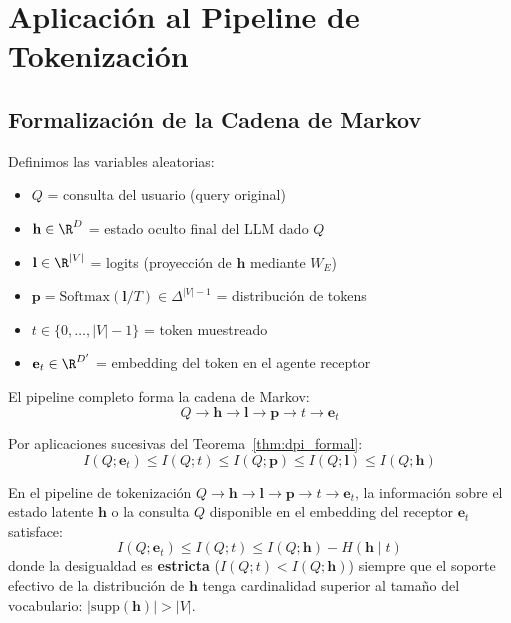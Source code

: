 \section{Aplicación al Pipeline de Tokenización}

\subsection{Formalización de la Cadena de Markov}

Definimos las variables aleatorias:
\begin{itemize}
\item $Q$ = consulta del usuario (query original)
\item $\mathbf{h} \in \R^D$ = estado oculto final del LLM dado $Q$
\item $\mathbf{l} \in \R^{|V|}$ = logits (proyección de $\mathbf{h}$ mediante $W_E$)
\item $\mathbf{p} = \text{Softmax}(\mathbf{l}/T) \in \Delta^{|V|-1}$ = distribución de tokens
\item $t \in \{0,\ldots,|V|-1\}$ = token muestreado
\item $\mathbf{e}_t \in \R^{D'}$ = embedding del token en el agente receptor
\end{itemize}

El pipeline completo forma la cadena de Markov:
\begin{equation}
Q \to \mathbf{h} \to \mathbf{l} \to \mathbf{p} \to t \to \mathbf{e}_t
\end{equation}

Por aplicaciones sucesivas del Teorema~\ref{thm:dpi_formal}:
\begin{equation}
I(Q; \mathbf{e}_t) \le I(Q; t) \le I(Q; \mathbf{p}) \le I(Q; \mathbf{l}) \le I(Q; \mathbf{h})
\label{eq:dpi_chain}
\end{equation}

\begin{corollary}
\label{cor:dpi_acumulada}
En el pipeline de tokenización $Q \to \mathbf{h} \to \mathbf{l} \to \mathbf{p} \to t \to \mathbf{e}_t$,
la información sobre el estado latente $\mathbf{h}$ o la consulta $Q$ disponible
en el embedding del receptor $\mathbf{e}_t$ satisface:
\begin{equation}
I(Q; \mathbf{e}_t) \le I(Q; t) \le I(Q; \mathbf{h}) - H(\mathbf{h} \mid t)
\end{equation}
donde la desigualdad es \textbf{estricta} ($I(Q; t) < I(Q; \mathbf{h})$) siempre que 
el soporte efectivo de la distribución de $\mathbf{h}$ tenga cardinalidad 
superior al tamaño del vocabulario: $|\text{supp}(\mathbf{h})| > |V|$.
\end{corollary}


